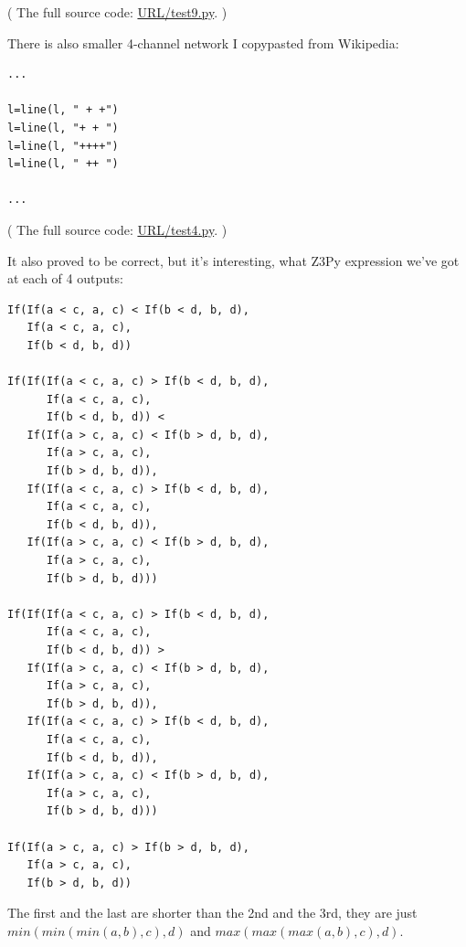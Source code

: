 

( The full source code: \url{URL/test9.py}. )

There is also smaller 4-channel network I copypasted from Wikipedia:

\begin{lstlisting}
...

l=line(l, " + +")
l=line(l, "+ + ")
l=line(l, "++++")
l=line(l, " ++ ")

...
\end{lstlisting}

( The full source code: \url{URL/test4.py}. )

It also proved to be correct, but it's interesting, what Z3Py expression we've got at each of 4 outputs:

\begin{lstlisting}
If(If(a < c, a, c) < If(b < d, b, d),
   If(a < c, a, c),
   If(b < d, b, d))

If(If(If(a < c, a, c) > If(b < d, b, d),
      If(a < c, a, c),
      If(b < d, b, d)) <
   If(If(a > c, a, c) < If(b > d, b, d),
      If(a > c, a, c),
      If(b > d, b, d)),
   If(If(a < c, a, c) > If(b < d, b, d),
      If(a < c, a, c),
      If(b < d, b, d)),
   If(If(a > c, a, c) < If(b > d, b, d),
      If(a > c, a, c),
      If(b > d, b, d)))

If(If(If(a < c, a, c) > If(b < d, b, d),
      If(a < c, a, c),
      If(b < d, b, d)) >
   If(If(a > c, a, c) < If(b > d, b, d),
      If(a > c, a, c),
      If(b > d, b, d)),
   If(If(a < c, a, c) > If(b < d, b, d),
      If(a < c, a, c),
      If(b < d, b, d)),
   If(If(a > c, a, c) < If(b > d, b, d),
      If(a > c, a, c),
      If(b > d, b, d)))

If(If(a > c, a, c) > If(b > d, b, d),
   If(a > c, a, c),
   If(b > d, b, d))
\end{lstlisting}

The first and the last are shorter than the 2nd and the 3rd, they are just
$min(min(min(a,b),c),d)$ and 
$max(max(max(a,b),c),d)$.

